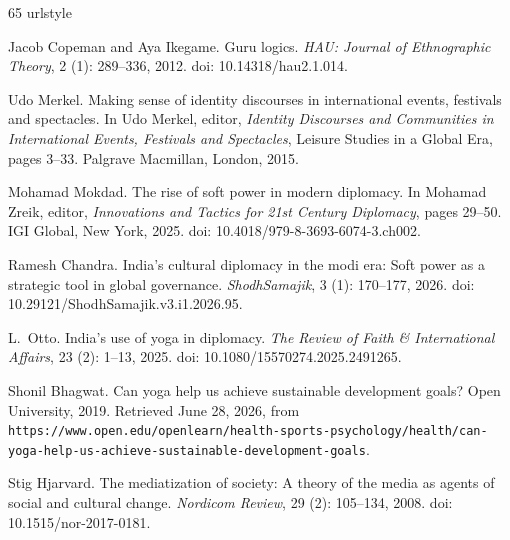 \documentclass[11pt]{article}
\begin{document}
\begin{thebibliography}{65}
\providecommand{\natexlab}[1]{#1}
\providecommand{\url}[1]{\texttt{#1}}
\expandafter\ifx\csname urlstyle\endcsname\relax
  \providecommand{\doi}[1]{doi: #1}\else
  \providecommand{\doi}{doi: \begingroup \urlstyle{rm}\Url}\fi

Jacob Copeman and Aya Ikegame.
\newblock Guru logics.
\newblock \emph{HAU: Journal of Ethnographic Theory}, 2 (1):
  289--336, 2012.
\newblock \doi{10.14318/hau2.1.014}.

Udo Merkel.
\newblock Making sense of identity discourses in international events,
  festivals and spectacles.
\newblock In Udo Merkel, editor, \emph{Identity Discourses and Communities in
  International Events, Festivals and Spectacles}, Leisure Studies in a Global
  Era, pages 3--33. Palgrave Macmillan, London, 2015.

Mohamad Mokdad.
\newblock The rise of soft power in modern diplomacy.
\newblock In Mohamad Zreik, editor, \emph{Innovations and Tactics for 21st
  Century Diplomacy}, pages 29--50. IGI Global, New York, 2025.
\newblock \doi{10.4018/979-8-3693-6074-3.ch002}.

Ramesh Chandra.
\newblock India’s cultural diplomacy in the modi era: Soft power as a
  strategic tool in global governance.
\newblock \emph{ShodhSamajik}, 3 (1): 170--177, 2026.
\newblock \doi{10.29121/ShodhSamajik.v3.i1.2026.95}.

L.~Otto.
\newblock India’s use of yoga in diplomacy.
\newblock \emph{The Review of Faith \& International Affairs}, 23
  (2): 1--13, 2025.
\newblock \doi{10.1080/15570274.2025.2491265}.

Shonil Bhagwat.
\newblock Can yoga help us achieve sustainable development goals?
\newblock Open University, 2019.
\newblock Retrieved June 28, 2026, from
  \url{https://www.open.edu/openlearn/health-sports-psychology/health/can-yoga-help-us-achieve-sustainable-development-goals}.

Stig Hjarvard.
\newblock The mediatization of society: A theory of the media as agents of
  social and cultural change.
\newblock \emph{Nordicom Review}, 29 (2): 105--134, 2008.
\newblock \doi{10.1515/nor-2017-0181}.


\end{thebibliography}
\end{document}

